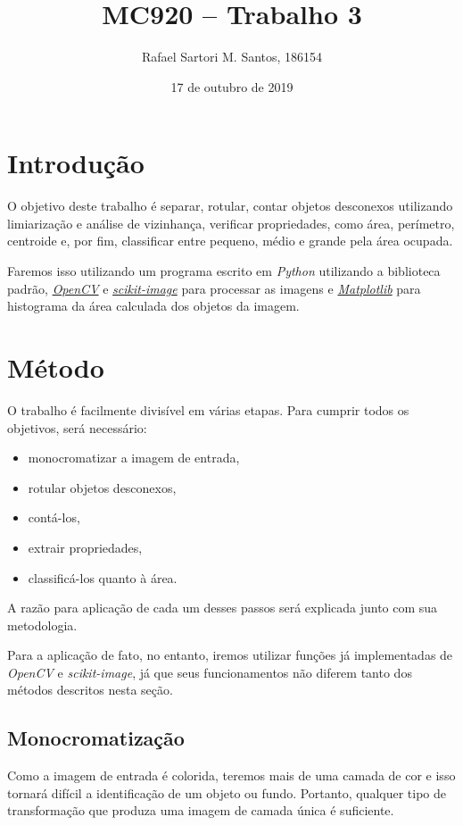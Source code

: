 \documentclass[brazilian,a4paper,twocolumn]{article}
\title{MC920 -- Trabalho 3}
\author{Rafael Sartori M. Santos, 186154}
\date{17 de outubro de 2019}
\begin{document}
\maketitle


\section{Introdução}

    O objetivo deste trabalho é separar, rotular, contar objetos desconexos utilizando limiarização e análise de vizinhança, verificar propriedades, como área, perímetro, centroide e, por fim, classificar entre pequeno, médio e grande pela área ocupada.

    Faremos isso utilizando um programa escrito em \emph{Python} utilizando a biblioteca padrão, \href{https://opencv.org/}{\emph{OpenCV}} e \href{https://scikit-image.org/}{\emph{scikit-image}} para processar as imagens e \href{https://matplotlib.org/}{\emph{Matplotlib}} para histograma da área calculada dos objetos da imagem.


\section{Método}

    O trabalho é facilmente divisível em várias etapas. Para cumprir todos os objetivos, será necessário:
    \begin{itemize}
        \item monocromatizar a imagem de entrada,
        \item rotular objetos desconexos,
        \item contá-los,
        \item extrair propriedades,
        \item classificá-los quanto à área.
    \end{itemize}

    A razão para aplicação de cada um desses passos será explicada junto com sua metodologia.

    Para a aplicação de fato, no entanto, iremos utilizar funções já implementadas de \emph{OpenCV} e \emph{scikit-image}, já que seus funcionamentos não diferem tanto dos métodos descritos nesta seção.

    \subsection{Monocromatização}

        Como a imagem de entrada é colorida, teremos mais de uma camada de cor e isso tornará difícil a identificação de um objeto ou fundo. Portanto, qualquer tipo de transformação que produza uma imagem de camada única é suficiente.
\end{document}
